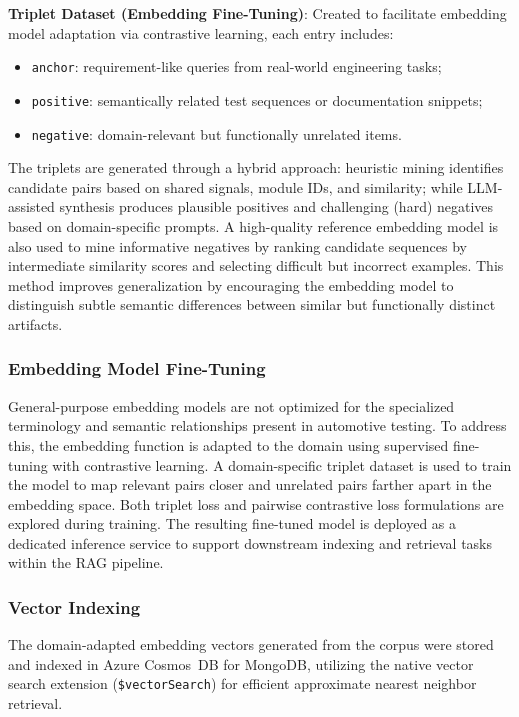 \documentclass[a4paper,fleqn]{cas-dc}
\renewcommand{\textit}[1]{#1}
\begin{document}
\textbf{Triplet Dataset (Embedding Fine-Tuning)}: Created to facilitate embedding model adaptation via contrastive learning, each entry includes:
    \begin{itemize}
        \item \texttt{anchor}: requirement-like queries from real-world engineering tasks;
        \item \texttt{positive}: semantically related test sequences or documentation snippets;
        \item \texttt{negative}: domain-relevant but functionally unrelated items.
    \end{itemize}
    The triplets are generated through a hybrid approach: heuristic mining identifies candidate pairs based on shared signals, module IDs, and similarity; while LLM-assisted synthesis produces plausible positives and challenging (hard) negatives based on domain-specific prompts. A high-quality reference embedding model is also used to mine \textit{informative negatives} by ranking candidate sequences by intermediate similarity scores and selecting difficult but incorrect examples. This method improves generalization by encouraging the embedding model to distinguish subtle semantic differences between similar but functionally distinct artifacts.


\subsubsection{Embedding Model Fine-Tuning} 
General-purpose embedding models are not optimized for the specialized terminology and semantic relationships present in automotive testing. To address this, the embedding function is adapted to the domain using supervised fine-tuning with contrastive learning. A domain-specific triplet dataset is used to train the model to map relevant pairs closer and unrelated pairs farther apart in the embedding space. Both triplet loss and pairwise contrastive loss formulations are explored during training. The resulting fine-tuned model is deployed as a dedicated inference service to support downstream indexing and retrieval tasks within the RAG pipeline.

\subsubsection{Vector Indexing}
The domain-adapted embedding vectors generated from the corpus were stored and indexed in Azure Cosmos~DB for MongoDB, utilizing the native vector search extension (\texttt{\$vectorSearch}) for efficient approximate nearest neighbor retrieval. 
\end{document}
